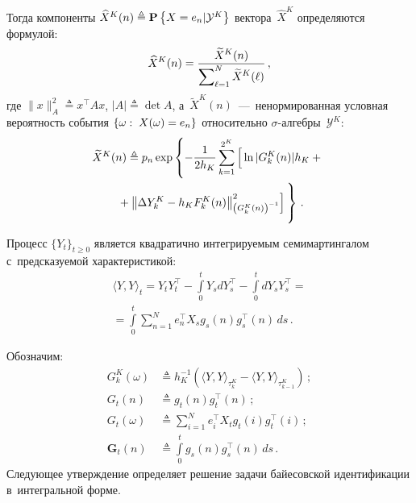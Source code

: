 \begin{multicols}{2}
\begin{align*}
  \end{align*}
  Тогда компоненты $\widehat{X}^K(n) \triangleq \mathbf{P}\left\{ X=e_n|\mathcal{Y}^K \right\}$ 
  вектора~$\widehat{X}^K$ определяются формулой:
    \begin{equation}
    \widehat{X}^K(n) = \displaystyle\frac{\displaystyle \widetilde{X}^K(n)\mathstrut}{\displaystyle \sum\nolimits_{\ell=1}^N \widetilde{X}^K(\ell)  \mathstrut}\,,
  \label{eq:discr_class}
  \end{equation}
  где $\|x\|_A^2 \triangleq x^{\top}Ax$, $|A| \triangleq \det A$, 
  а~$\widetilde{X}^K(n)$~---~ненормированная условная 
  вероятность события $\{\omega: \; X(\omega) \hm= e_n\}$ 
  относительно $\sigma$-ал\-геб\-ры~$\mathcal{Y}^K$:
  \begin{multline}
  \widetilde{X}^K(n) \triangleq p_n\exp\left\{
  -\fr{1}{2h_K}\sum\limits_{k=1}^{2^K}\left[
  \vphantom{\left\|\Delta Y^K_k-h_K F_k^K(n)
  \right\|^2_{\left(G_k^K(n)\right)^{-1}}}
  \ln|G_k^K(n)|h_K +{}\right.\right.\\
\left.\left.  {}+ \left\|\Delta Y^K_k-h_K F_k^K(n)
  \right\|^2_{\left(G_k^K(n)\right)^{-1}}
    \right]
  \vphantom{\sum\limits_{k=1}^{2^K}}
  \right\}\,.
 \label{eq:discr_class_22}
  \end{multline}
  

  Процесс $\{Y_t\}_{t \geqslant 0}$ является квадратично интегрируемым 
  семимартингалом с~предсказуемой характеристикой:
  \begin{multline*}
  \langle Y,Y\rangle_t =
  Y_t Y_t^{\top}- \int\limits_0^t Y_s dY_s^{\top} - \int\limits_0^t dY_s Y_s^{\top}={}\\
  {}=
  \int\limits_0^t \sum\limits_{n=1}^Ne_n^{\top}X_s g_s(n)g_s^{\top}(n)\,ds\,.
  \end{multline*}

  Обозначим:
  \begin{align*}
  G_k^K(\omega) &\triangleq h_K^{-1}\left( \langle Y,Y\rangle_{\tau_{k}^K} -
  \langle Y,Y\rangle_{\tau_{k-1}^K}\right)\,;\\
   G_t(n) &\triangleq g_t(n)g_t^{\top}(n)\,;\\
  G_t(\omega) &\triangleq  \displaystyle\sum\limits_{i=1}^N e_i^{\top}X_t
  g_t(i)g_t^{\top}(i)\,; \\
     \mathbf{G}_t(n) &\triangleq 
  \int\limits_0^t g_s(n)g^{\top}_s(n)\,ds\,.
    \end{align*}
  Следующее утверждение определяет решение задачи байесовской 
  идентификации в~интегральной форме.
  
    \smallskip


\end{multicols}
